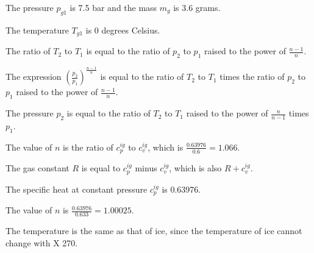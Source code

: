The pressure \( p_{g1} \) is 7.5 bar and the mass \( m_{g} \) is 3.6 grams.

The temperature \( T_{g1} \) is 0 degrees Celsius.

The ratio of \( T_2 \) to \( T_1 \) is equal to the ratio of \( p_2 \) to \( p_1 \) raised to the power of \( \frac{n-1}{n} \).

The expression \( \left( \frac{p_2}{p_1} \right)^{\frac{n-1}{n}} \) is equal to the ratio of \( T_2 \) to \( T_1 \) times the ratio of \( p_2 \) to \( p_1 \) raised to the power of \( \frac{n-1}{n} \).

The pressure \( p_2 \) is equal to the ratio of \( T_2 \) to \( T_1 \) raised to the power of \( \frac{n}{n-1} \) times \( p_1 \).

The value of \( n \) is the ratio of \( c_p^{ig} \) to \( c_v^{ig} \), which is \( \frac{0.63976}{0.6} = 1.066 \).

The gas constant \( R \) is equal to \( c_p^{ig} \) minus \( c_v^{ig} \), which is also \( R + c_v^{ig} \).

The specific heat at constant pressure \( c_p^{ig} \) is 0.63976.

The value of \( n \) is \( \frac{0.63976}{0.633} = 1.00025 \).

The temperature is the same as that of ice, since the temperature of ice cannot change with X 270.